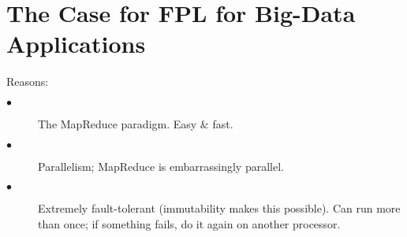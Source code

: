 \documentclass[twoside]{article}
\begin{document}
\section{The Case for FPL for Big-Data Applications}

Reasons:

\begin{description}

\item[$\bullet$] The MapReduce paradigm. Easy & fast.

\item[$\bullet$] Parallelism; MapReduce is embarrassingly parallel.

\item[$\bullet$] Extremely fault-tolerant (immutability makes this possible). Can run more than once; if something fails, do it again on another processor.

\end{description}
\end{document}
